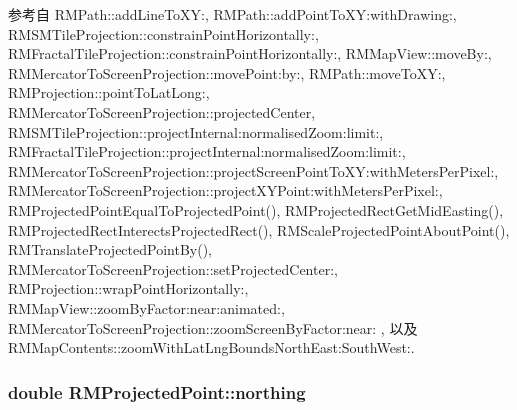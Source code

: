 参考自 R\-M\-Path\-::add\-Line\-To\-X\-Y\-:, R\-M\-Path\-::add\-Point\-To\-X\-Y\-:with\-Drawing\-:, R\-M\-S\-M\-Tile\-Projection\-::constrain\-Point\-Horizontally\-:, R\-M\-Fractal\-Tile\-Projection\-::constrain\-Point\-Horizontally\-:, R\-M\-Map\-View\-::move\-By\-:, R\-M\-Mercator\-To\-Screen\-Projection\-::move\-Point\-:by\-:, R\-M\-Path\-::move\-To\-X\-Y\-:, R\-M\-Projection\-::point\-To\-Lat\-Long\-:, R\-M\-Mercator\-To\-Screen\-Projection\-::projected\-Center, R\-M\-S\-M\-Tile\-Projection\-::project\-Internal\-:normalised\-Zoom\-:limit\-:, R\-M\-Fractal\-Tile\-Projection\-::project\-Internal\-:normalised\-Zoom\-:limit\-:, R\-M\-Mercator\-To\-Screen\-Projection\-::project\-Screen\-Point\-To\-X\-Y\-:with\-Meters\-Per\-Pixel\-:, R\-M\-Mercator\-To\-Screen\-Projection\-::project\-X\-Y\-Point\-:with\-Meters\-Per\-Pixel\-:, R\-M\-Projected\-Point\-Equal\-To\-Projected\-Point(), R\-M\-Projected\-Rect\-Get\-Mid\-Easting(), R\-M\-Projected\-Rect\-Interects\-Projected\-Rect(), R\-M\-Scale\-Projected\-Point\-About\-Point(), R\-M\-Translate\-Projected\-Point\-By(), R\-M\-Mercator\-To\-Screen\-Projection\-::set\-Projected\-Center\-:, R\-M\-Projection\-::wrap\-Point\-Horizontally\-:, R\-M\-Map\-View\-::zoom\-By\-Factor\-:near\-:animated\-:, R\-M\-Mercator\-To\-Screen\-Projection\-::zoom\-Screen\-By\-Factor\-:near\-: , 以及 R\-M\-Map\-Contents\-::zoom\-With\-Lat\-Lng\-Bounds\-North\-East\-:\-South\-West\-:.

\hypertarget{struct_r_m_projected_point_a3fb51e009314ab276305916e6a881668}{
\subsubsection[{northing}]{\setlength{\rightskip}{0pt plus 5cm}double R\-M\-Projected\-Point\-::northing}}\label{struct_r_m_projected_point_a3fb51e009314ab276305916e6a881668}


